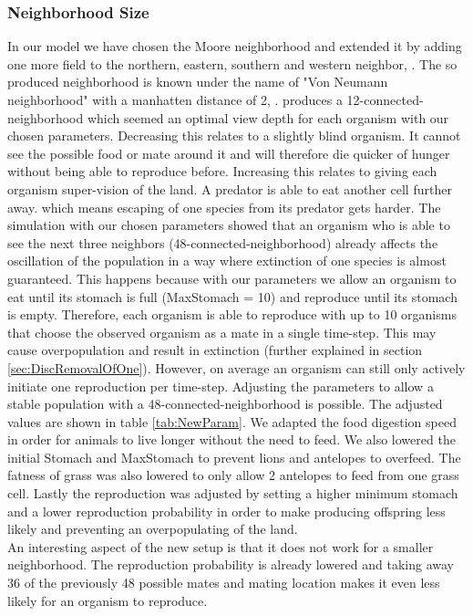 \documentclass[11pt]{article}
\begin{document}
\subsubsection{Neighborhood Size}
\label{sec:DiscNeighbourhood}
In our model we have chosen the Moore neighborhood and extended it by adding one more field to the northern, eastern, southern and western neighbor, \cite{mooreNeighborhood}. The so produced neighborhood is known under the name of "Von Neumann neighborhood" with a manhatten distance of 2, \cite{vonNeumannNeighborhood}.  produces a 12-connected-neighborhood which seemed an optimal view depth for each organism with our chosen parameters. Decreasing this relates to a slightly blind organism. It cannot see the possible food or mate around it and will therefore die quicker of hunger without being able to reproduce before. Increasing this relates to giving each organism super-vision of the land. A predator is able to eat another cell further away. which means escaping of one species from its predator gets harder. The simulation with our chosen parameters showed that an organism who is able to see the next three neighbors (48-connected-neighborhood) already affects the oscillation of the population in a way where extinction of one species is almost guaranteed. This happens because with our parameters we allow an organism to eat until its stomach is full (MaxStomach = 10) and reproduce until its stomach is empty. Therefore, each organism is able to reproduce with up to 10 organisms that choose the observed organism as a mate in a single time-step. This may cause overpopulation and result in extinction (further explained in section \ref{sec:DiscRemovalOfOne}). However, on average an organism can still only actively initiate one reproduction per time-step. Adjusting the parameters to allow a stable population with a 48-connected-neighborhood is possible. The adjusted values are shown in table \ref{tab:NewParam}. We adapted the food digestion speed in order for animals to live longer without the need to feed. We also lowered the initial Stomach and MaxStomach to prevent lions and antelopes to overfeed. The fatness of grass was also lowered to only allow 2 antelopes to feed from one grass cell. Lastly the reproduction was adjusted by setting a higher minimum stomach and a lower reproduction probability in order to make producing offspring less likely and preventing an overpopulating of the land.\\
An interesting aspect of the new setup is that it does not work for a smaller neighborhood. The reproduction probability is already lowered and taking away 36 of the previously 48 possible mates and mating location makes it even less likely for an organism to reproduce. 
\end{document}
